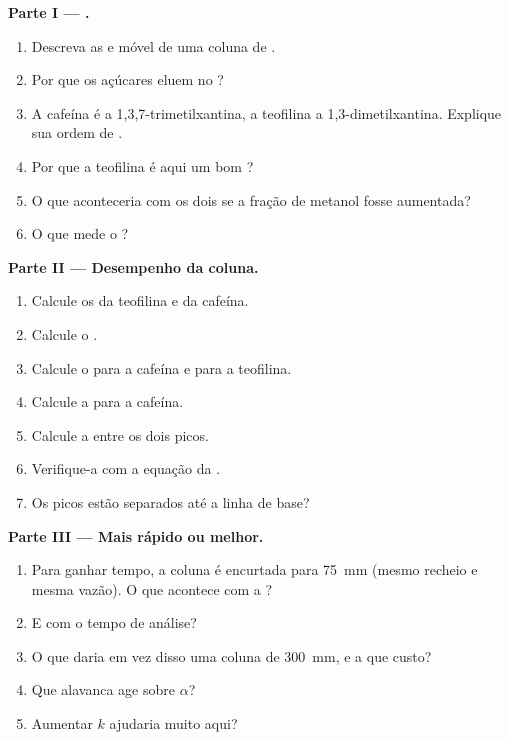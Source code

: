 \begin{problem}
\medskip
\noindent\textbf{Parte I --- .}
\begin{enumerate}
  \item Descreva as  e móvel de uma coluna de .
  \item Por que os açúcares eluem no ?
  \item A cafeína é a 1,3,7-trimetilxantina, a teofilina a 1,3-dimetilxantina. Explique sua ordem de
        .
  \item Por que a teofilina é aqui um bom ?
  \item O que aconteceria com os dois  se a fração de metanol fosse aumentada?
  \item O que mede o ?
\end{enumerate}

\medskip
\noindent\textbf{Parte II --- Desempenho da coluna.}
\begin{enumerate}[resume]
  \item Calcule os  da teofilina e da cafeína.
  \item Calcule o .
  \item Calcule o  para a cafeína e para a teofilina.
  \item Calcule a  para a cafeína.
  \item Calcule a  entre os dois picos.
  \item Verifique-a com a equação da .
  \item Os picos estão separados até a linha de base?
\end{enumerate}

\medskip
\noindent\textbf{Parte III --- Mais rápido ou melhor.}
\begin{enumerate}[resume]
  \item Para ganhar tempo, a coluna é encurtada para \qty{75}{mm} (mesmo recheio e mesma vazão). O que
        acontece com a ?
  \item E com o tempo de análise?
  \item O que daria em vez disso uma coluna de \qty{300}{mm}, e a que custo?
  \item Que alavanca age sobre $\alpha$?
  \item Aumentar $k$ ajudaria muito aqui?
\end{enumerate}


\end{problem}
